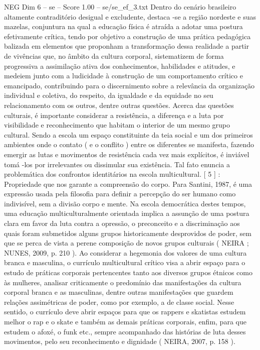 \begin{textsample}{NEG Dim 6 – se – Score 1.00 – se/se\_ef\_3.txt}
Dentro do cenário brasileiro altamente contraditório desigual e excludente, destaca -se a região nordeste e suas mazelas, conjuntura na qual a educação física é atraída a adotar uma postura efetivamente crítica, tendo por objetivo a construção de uma prática pedagógica balizada em elementos que proponham a transformação dessa realidade a partir de vivências que, no âmbito da cultura corporal, sistematizem de forma progressiva a assimilação ativa dos conhecimentos, habilidades e atitudes, e medeiem junto com a ludicidade à construção de um comportamento crítico e emancipado, contribuindo para o discernimento sobre a relevância da organização individual e coletiva, do respeito, da igualdade e da equidade no seu relacionamento com os outros, dentre outras questões.
Acerca das questões culturais, é importante considerar a resistência, a diferença e a luta por visibilidade e reconhecimento que habitam o interior de um mesmo grupo cultural.
Sendo a escola um espaço constituinte da teia social e um dos primeiros ambientes onde o contato ( e o conflito ) entre os diferentes se manifesta, fazendo emergir as lutas e movimentos de resistência cada vez mais explícitos, é inviável tomá -los por irrelevantes ou dissimular sua existência.
Tal fato enuncia a problemática dos confrontos identitários na escola multicultural. [ 5 ] : Propriedade que nos garante a compreensão do corpo.
Para Santini, 1987, é uma expressão usada pela filosofia para definir a percepção do ser humano como indivisível, sem a divisão corpo e mente.
Na escola democrática destes tempos, uma educação multiculturalmente orientada implica a assunção de uma postura clara em favor da luta contra a opressão, o preconceito e a discriminação aos quais foram submetidos alguns grupos historicamente desprovidos de poder, sem que se perca de vista a perene composição de novos grupos culturais ( NEIRA ; NUNES, 2009, p. 210 ).
Ao considerar a hegemonia dos valores de uma cultura branca e masculina, o currículo multicultural crítico visa a abrir espaço para o estudo de práticas corporais pertencentes tanto aos diversos grupos étnicos como às mulheres, analisar criticamente o predomínio das manifestações da cultura corporal branca e as masculinas, dentre outras manifestações que guardem relações assimétricas de poder, como por exemplo, a de classe social.
Nesse sentido, o currículo deve abrir espaços para que os rappers e skatistas estudem melhor o rap e o skate e também as demais práticas corporais, enfim, para que estudem o afoxé, o funk etc., sempre acompanhado das histórias de luta desses movimentos, pelo seu reconhecimento e dignidade ( NEIRA, 2007, p. 158 ).

\end{textsample}
